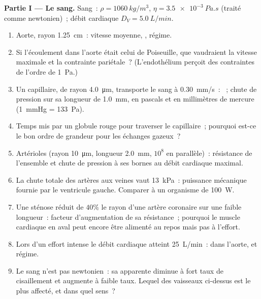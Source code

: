 \begin{problem}
\medskip
\noindent\textbf{Partie I --- Le sang.}
Sang~: $\rho = \qty{1060}{kg/m^3}$, $\eta = \qty{3.5e-3}{Pa.s}$ (traité comme
newtonien)~; débit cardiaque $D_V = \qty{5.0}{L/min}$.
\begin{enumerate}
  \item Aorte, rayon \qty{1.25}{cm}~: vitesse moyenne, , régime.
  \item Si l'écoulement dans l'aorte était celui de Poiseuille, que vaudraient la
        vitesse maximale et la contrainte pariétale~? (L'endothélium
        perçoit des contraintes de l'ordre de \qty{1}{Pa}.)
  \item Un capillaire, de rayon \qty{4.0}{\micro m}, transporte le sang à
        \qty{0.30}{mm/s}~: ~; chute de pression sur sa
        longueur de \qty{1.0}{mm}, en pascals et en millimètres de mercure
        (\qty{1}{mmHg} = \qty{133}{Pa}).
  \item Temps mis par un globule rouge pour traverser le capillaire~; pourquoi est-ce le
        bon ordre de grandeur pour les échanges gazeux~?
  \item Artérioles (rayon \qty{10}{\micro m}, longueur \qty{2.0}{mm}, $10^8$
        en parallèle)~: résistance de l'ensemble et chute de pression
        à ses bornes au débit cardiaque maximal.
  \item La chute totale des artères aux veines vaut \qty{13}{kPa}~: puissance
        mécanique fournie par le ventricule gauche. Comparer à un
        organisme de \qty{100}{W}.
  \item Une sténose réduit de $40\%$ le rayon d'une artère coronaire
        sur une faible longueur~: facteur d'augmentation de sa résistance~; pourquoi
        le muscle cardiaque en aval peut encore être alimenté au repos mais
        pas à l'effort.
  \item Lors d'un effort intense le débit cardiaque atteint \qty{25}{L/min}~:
         dans l'aorte, et régime.
  \item Le sang n'est pas newtonien~: sa  apparente diminue à fort
        taux de cisaillement et augmente à faible taux. Lequel des vaisseaux ci-dessus est le
        plus affecté, et dans quel sens~?
\end{enumerate}


\end{problem}
